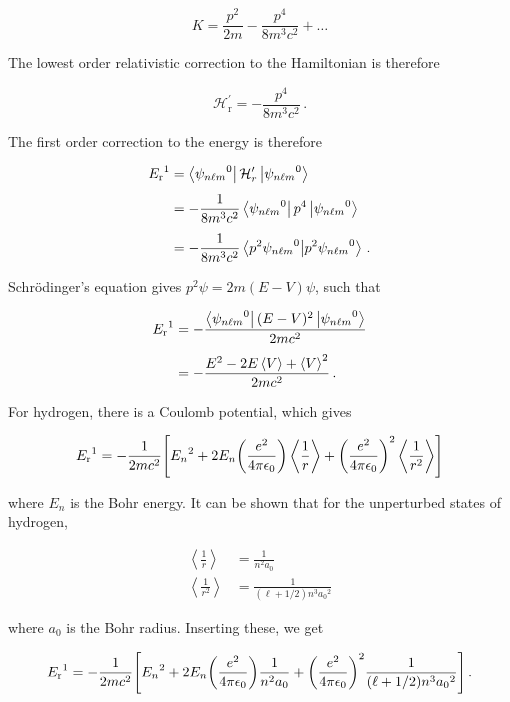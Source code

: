 \documentclass[12pt, titlepage]{article}
\newcommand{\exv}[1]{\left\langle #1 \right\rangle}
\begin{document}
\begin{equation}
	K = \frac{p^2}{2m} - \frac{p^4}{8m^3c^2} + \ldots
\end{equation}

The lowest order relativistic correction to the Hamiltonian is therefore

\begin{equation}
	\mathcal{H}_{\text{r}}^\prime = -\frac{p^4}{8m^3c^2} \,.
\end{equation}

The first order correction to the energy is therefore

\begin{align*}
	{E_{\text{r}}}^{1} &= \bra{{\psi_{n\ell m}}^0}{\mathcal{H}_{r}}^\prime\ket{{\psi_{n\ell m}}^0} \\[4pt]
	&= -\frac{1}{8m^3c^2}\bra{{\psi_{n\ell m}}^0}p^4\ket{{\psi_{n\ell m}}^0} \\[4pt]
	&= -\frac{1}{8m^3c^2}\bra{p^2{\psi_{n\ell m}}^0}\ket{p^2{\psi_{n\ell m}}^0} \,.
\end{align*}

Schrödinger's equation gives $p^2\psi = 2m(E-V)\psi$, such that

\begin{align*}
	{E_{\text{r}}}^{1} &= -\frac{\bra{{\psi_{n\ell m}}^0}(E-V)^2\ket{{\psi_{n\ell m}}^0}}{2mc^2} \\[4pt]
	&= -\frac{E^2 - 2E\exv{V} + \exv{V}^2}{2mc^2} \,.
\end{align*}

For hydrogen, there is a Coulomb potential, which gives

\begin{equation}
	{E_{\text{r}}}^{1} = -\frac{1}{2mc^2}\qty[{E_n}^2 + 2E_n\qty(\frac{e^2}{4\pi\epsilon_0})\exv{\frac{1}{r}} + \qty(\frac{e^2}{4\pi\epsilon_0})^2\exv{\frac{1}{r^2}}]
\end{equation}

where $E_n$ is the Bohr energy. It can be shown that for the unperturbed states of hydrogen,

\begin{align}
	\exv{\frac{1}{r}} &= \frac{1}{n^2a_0} \\[4pt]
	\exv{\frac{1}{r^2}} &= \frac{1}{(\ell+1/2)n^3{a_0}^2}
\end{align}

where $a_0$ is the Bohr radius. Inserting these, we get

\begin{equation*}
{E_{\text{r}}}^{1} = -\frac{1}{2mc^2}\qty[{E_n}^2 + 2E_n\qty(\frac{e^2}{4\pi\epsilon_0})\frac{1}{n^2a_0} + \qty(\frac{e^2}{4\pi\epsilon_0})^2\frac{1}{(\ell+1/2)n^3{a_0}^2}] \,.
\end{equation*}
\end{document}
